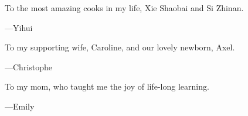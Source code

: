 \cleardoublepage\newpage\thispagestyle{empty}\null
\cleardoublepage\newpage\thispagestyle{empty}\null
\thispagestyle{empty}
\begin{large}
To the most amazing cooks in my life, Xie Shaobai and Si Zhinan.
\begin{flushright}
---Yihui
\end{flushright}

To my supporting wife, Caroline, and our lovely newborn, Axel.
\begin{flushright}
---Christophe
\end{flushright}

To my mom, who taught me the joy of life-long learning.
\begin{flushright}
---Emily
\end{flushright}
\end{large}

\setlength{\abovedisplayskip}{-5pt}
\setlength{\abovedisplayshortskip}{-5pt}
